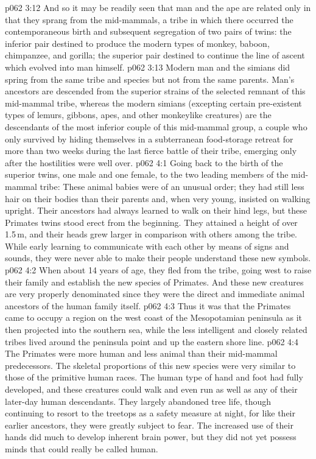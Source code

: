 \vs p062 3:12 And so it may be readily seen that man and the ape are related only in that they sprang from the mid\hyp{}mammals, a tribe in which there occurred the contemporaneous birth and subsequent segregation of two pairs of twins: the inferior pair destined to produce the modern types of monkey, baboon, chimpanzee, and gorilla; the superior pair destined to continue the line of ascent which evolved into man himself.
\vs p062 3:13 Modern man and the simians did spring from the same tribe and species but not from the same parents. Man’s ancestors are descended from the superior strains of the selected remnant of this mid\hyp{}mammal tribe, whereas the modern simians (excepting certain pre\hyp{}existent types of lemurs, gibbons, apes, and other monkeylike creatures) are the descendants of the most inferior couple of this mid\hyp{}mammal group, a couple who only survived by hiding themselves in a subterranean food\hyp{}storage retreat for more than two weeks during the last fierce battle of their tribe, emerging only after the hostilities were well over.
\vs p062 4:1 Going back to the birth of the superior twins, one male and one female, to the two leading members of the mid\hyp{}mammal tribe: These animal babies were of an unusual order; they had still less hair on their bodies than their parents and, when very young, insisted on walking upright. Their ancestors had always learned to walk on their hind legs, but these Primates twins stood erect from the beginning. They attained a height of over 1.5\,m, and their heads grew larger in comparison with others among the tribe. While early learning to communicate with each other by means of signs and sounds, they were never able to make their people understand these new symbols.
\vs p062 4:2 When about 14 years of age, they fled from the tribe, going west to raise their family and establish the new species of Primates. And these new creatures are very properly denominated  since they were the direct and immediate animal ancestors of the human family itself.
\vs p062 4:3 Thus it was that the Primates came to occupy a region on the west coast of the Mesopotamian peninsula as it then projected into the southern sea, while the less intelligent and closely related tribes lived around the peninsula point and up the eastern shore line.
\vs p062 4:4 \pc The Primates were more human and less animal than their mid\hyp{}mammal predecessors. The skeletal proportions of this new species were very similar to those of the primitive human races. The human type of hand and foot had fully developed, and these creatures could walk and even run as well as any of their later\hyp{}day human descendants. They largely abandoned tree life, though continuing to resort to the treetops as a safety measure at night, for like their earlier ancestors, they were greatly subject to fear. The increased use of their hands did much to develop inherent brain power, but they did not yet possess minds that could really be called human.
